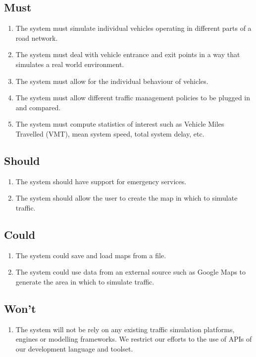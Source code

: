 \documentclass[11pt,a4paper]{article}
\begin{document}
\subsection{Must}
\label{section:must}
\begin{enumerate}[itemsep=-1ex]
  \item The system must simulate individual vehicles operating in different parts of a road network.
  \item The system must deal with vehicle entrance and exit points in a way that simulates a real world environment.
  \item The system must allow for the individual behaviour of vehicles.
  \item The system must allow different traffic management policies to be plugged in and compared.
  \item The system must compute statistics of interest such as Vehicle Miles Travelled (VMT), mean system speed, total system delay, etc. 
\end{enumerate}

\subsection{Should}
\begin{enumerate}[itemsep=-1ex]
  \item The system should have support for emergency services.
  \item The system should allow the user to create the map in which to simulate traffic.
\end{enumerate}

\subsection{Could}
\begin{enumerate}[itemsep=-1ex]
  \item The system could save and load maps from a file.
  \item The system could use data from an external source such as Google Maps to generate the area in which to simulate traffic.
\end{enumerate}

\subsection{Won't}
\begin{enumerate}[itemsep=-1ex]
  \item The system will not be rely on any existing traffic simulation platforms, engines or modelling frameworks.  We restrict our efforts to the use of APIs of our development language and toolset.
\end{enumerate}
\end{document}
